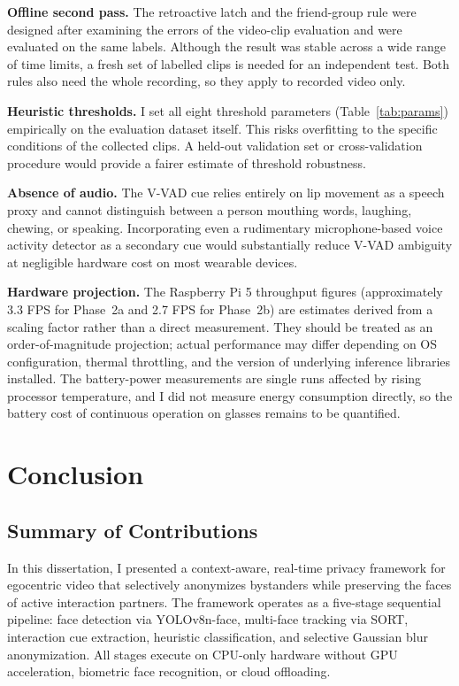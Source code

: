 \textbf{Offline second pass.} The retroactive latch and the friend-group rule were
designed after examining the errors of the video-clip evaluation and were evaluated
on the same labels. Although the result was stable across a wide range of time
limits, a fresh set of labelled clips is needed for an independent test. Both rules
also need the whole recording, so they apply to recorded video only.

\textbf{Heuristic thresholds.} I set all eight threshold parameters
(Table~\ref{tab:params}) empirically on the evaluation dataset itself. This risks
overfitting to the specific conditions of the collected clips. A held-out validation set or
cross-validation procedure would provide a fairer estimate of threshold robustness.

\textbf{Absence of audio.} The V-VAD cue relies entirely on lip movement as a
speech proxy and cannot distinguish between a person mouthing words, laughing,
chewing, or speaking. Incorporating even a rudimentary microphone-based voice
activity detector as a secondary cue would substantially reduce V-VAD ambiguity at
negligible hardware cost on most wearable devices.

\textbf{Hardware projection.} The Raspberry Pi 5 throughput figures (approximately
3.3 FPS for Phase~2a and 2.7 FPS for Phase~2b) are estimates derived from a scaling factor rather than a direct
measurement. They should be treated as an order-of-magnitude projection; actual
performance may differ depending on OS configuration, thermal throttling, and the
version of underlying inference libraries installed. The battery-power measurements
are single runs affected by rising processor temperature, and I did not measure
energy consumption directly, so the battery cost of continuous operation on glasses
remains to be quantified.

\section{Conclusion}
\label{sec:conclusion}

\subsection{Summary of Contributions}
\label{sec:conclusion_summary}

In this dissertation, I presented a context-aware, real-time privacy framework for
egocentric video that selectively anonymizes bystanders while preserving the faces
of active interaction partners. The framework operates as a five-stage sequential
pipeline: face detection via YOLOv8n-face, multi-face tracking via SORT, interaction
cue extraction, heuristic classification, and selective Gaussian blur anonymization.
All stages execute on CPU-only hardware without GPU acceleration, biometric face
recognition, or cloud offloading.

